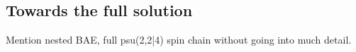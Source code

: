 
\subsection{Towards the full solution}

Mention nested BAE, full psu(2,2|4) spin chain without going into much detail.
